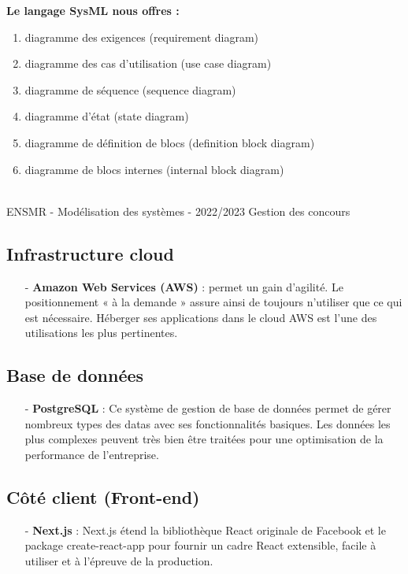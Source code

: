 \textbf{Le langage SysML nous offres :}
\begin{enumerate}
	\item diagramme des exigences (requirement diagram)
	\item diagramme des cas d’utilisation (use case diagram)
	\item diagramme de séquence (sequence diagram)
	\item diagramme d’état (state diagram)
	\item diagramme de définition de blocs (definition block diagram)
	\item diagramme de blocs internes (internal block diagram)
\end{enumerate}
\vfill
\noindent\makebox[\linewidth]{\rule{.8\paperwidth}{.6pt}}\\[0.2cm]
ENSMR - Modélisation des systèmes - 2022/2023 \hfill Gestion des concours
\noindent\makebox[\linewidth]{\rule{.8\paperwidth}{.6pt}}
\pagebreak

\subsection{Infrastructure cloud}
\begin{itemize}
	\item[-] \textbf{Amazon Web Services (AWS)} : permet un gain d’agilité. Le positionnement « à la demande » assure ainsi de toujours n’utiliser
		que ce qui est nécessaire. Héberger ses applications dans le cloud AWS est l’une des utilisations les plus pertinentes.
\end{itemize}

\subsection{Base de données}
\begin{itemize}
	\item[-] \textbf{PostgreSQL} : Ce système de gestion de base de données permet de gérer nombreux types des datas avec ses fonctionnalités basiques.
		Les données les plus complexes peuvent très bien être traitées pour une optimisation de la performance de l’entreprise.
\end{itemize}

\subsection{Côté client (Front-end)}
\begin{itemize}
	\item[-] \textbf{Next.js} : Next.js étend la bibliothèque React originale de Facebook et le package create-react-app pour fournir un cadre React 
    extensible, facile à utiliser et à l’épreuve de la production.
\end{itemize}

